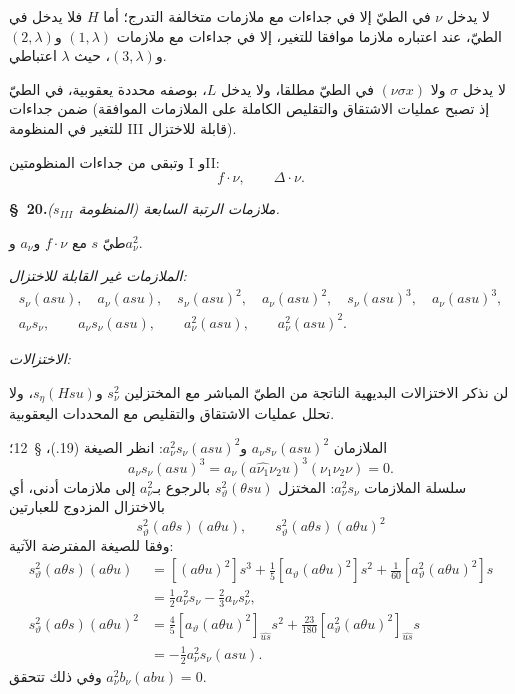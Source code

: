 \documentclass[11pt]{article}
\begin{document}
لا يدخل $\nu$ في الطيّ إلا في جداءات مع ملازمات متخالفة التدرج؛ أما $H$ فلا يدخل في الطيّ، عند اعتباره ملازما موافقا للتغير، إلا في جداءات مع ملازمات $(1,\lambda)$ و$(2,\lambda)$ و$(3,\lambda)$، حيث $\lambda$ اعتباطي.

لا يدخل $\sigma$ ولا $(\nu\sigma x)$ في الطيّ مطلقا، ولا يدخل $L$، بوصفه محددة يعقوبية، في الطيّ ضمن جداءات (إذ تصبح عمليات الاشتقاق والتقليص الكاملة على الملازمات الموافقة للتغير في المنظومة III قابلة للاختزال).

وتبقى من جداءات المنظومتين I وII:
\[
f\cdot \nu,\qquad \Delta\cdot \nu.
\]

\begin{center}
\textbf{\S\ 20.}\quad\emph{ملازمات الرتبة السابعة (المنظومة $s_{III}$).}
\end{center}

طيّ $s$ مع $f\cdot \nu$ و$a_\nu$ و$a_\nu^2$.

\noindent\emph{الملازمات غير القابلة للاختزال:}
\[
\begin{gathered}
s_\nu(asu),\quad a_\nu(asu),\quad s_\nu(asu)^2,\quad a_\nu(asu)^2,\quad
s_\nu(asu)^3,\quad a_\nu(asu)^3,\\
a_\nu s_\nu,\qquad a_\nu s_\nu(asu),\qquad a_\nu^2(asu),\qquad a_\nu^2(asu)^2.
\end{gathered}
\]

\noindent\emph{الاختزالات:}

لن نذكر الاختزالات البديهية الناتجة من الطيّ المباشر مع المختزلين $s_\nu^2$ و$s_\eta(Hsu)$، ولا تحلل عمليات الاشتقاق والتقليص مع المحددات اليعقوبية.

الملازمان $a_\nu s_\nu(asu)^2$ و$a_\nu^2s_\nu(asu)^2$: انظر الصيغة (19.)، \S\ 12؛
\[
a_\nu s_\nu(asu)^3=a_\nu(a\widehat{\nu_1}\nu_2u)^3(\nu_1\nu_2\nu)=0.
\]
سلسلة الملازمات $a_\nu^2s_\nu$: المختزل $s_\vartheta^2(\theta su)$ بالرجوع بـ$a_\nu^2$ إلى ملازمات أدنى، أي بالاختزال المزدوج للعبارتين
\[
s_\vartheta^2(a\theta s)(a\theta u),\qquad
s_\vartheta^2(a\theta s)(a\theta u)^2
\]
وفقا للصيغة المفترضة الآتية:
\[
\begin{aligned}
s_\vartheta^2(a\theta s)(a\theta u)
&=[(a\theta u)^2]s^3+\frac15[a_\vartheta(a\theta u)^2]s^2+\frac1{60}[a_\vartheta^2(a\theta u)^2]s\\
&=\frac12a_\nu^2s_\nu-\frac23a_\nu s_\nu^2,\\
s_\vartheta^2(a\theta s)(a\theta u)^2
&=\frac45[a_\vartheta(a\theta u)^2]_{\widehat{us}}s^2+\frac{23}{180}[a_\vartheta^2(a\theta u)^2]_{\widehat{us}}s\\
&=-\frac12a_\nu^2s_\nu(asu).
\end{aligned}
\]
وفي ذلك تتحقق $a_\nu^2b_\nu(abu)=0$.
\end{document}
